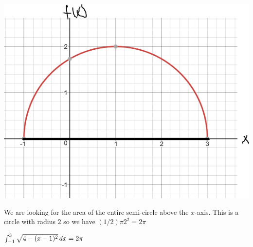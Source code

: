 \documentclass[ nooutcomes]{ximera}
\begin{document}
\begin{problem}
\begin{enumerate}
\begin{freeResponse}
\begin{image}
\includegraphics[scale=.4]{figure5.png}
\end{image}


We are looking for the area of the entire semi-circle above the $x$-axis.  This is a circle with radius $2$ so we have $(1/2)\pi 2^2=2 \pi$


$\int_{-1}^3 \sqrt{4-(x-1)^2} \,d x= 2\pi$


\end{freeResponse}

\end{enumerate}
\end{problem}
\end{document}

